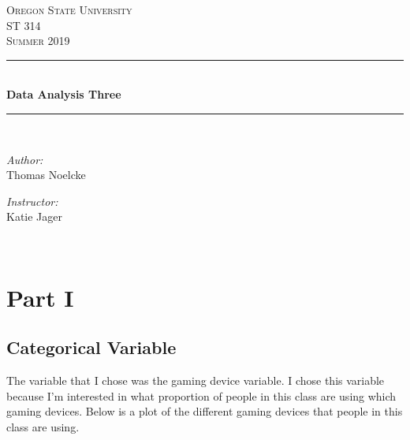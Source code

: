 \documentclass[letterpaper, onecolumn,10pt]{IEEEtran}
\begin{document}
    \begin{titlepage}
    \newcommand{\HRule}{\rule{\linewidth}{0.5mm}}
    \center
    \textsc{\Large Oregon State University}\\[1.5cm]
    \textsc{\Large ST 314}\\[0.5cm]
    \textsc{\Large Summer 2019}\\[0.5cm]
    \HRule \\[0.4cm]
    { \huge \bfseries Data Analysis Three}\\[0.4cm] %
    \HRule \\[1.5cm]
    \begin{minipage}{0.4\textwidth}
        \begin{flushleft} \large
        \emph{Author:}\\
        Thomas Noelcke
        \end{flushleft}
    \end{minipage}
    \begin{minipage}{0.4\textwidth}
        \begin{flushright} \large
        \emph{Instructor:} \\
        Katie Jager\\
        \end{flushright}
    \end{minipage}\\[2cm]
		\end{titlepage}
        
        \section{Part I}
            \subsection{Categorical Variable}
                The variable that I chose was the gaming device variable. I chose this variable because I'm interested in what proportion of people in this class are using which gaming devices. Below is a plot of the different gaming devices that people in this class are using.
                
\end{document}

